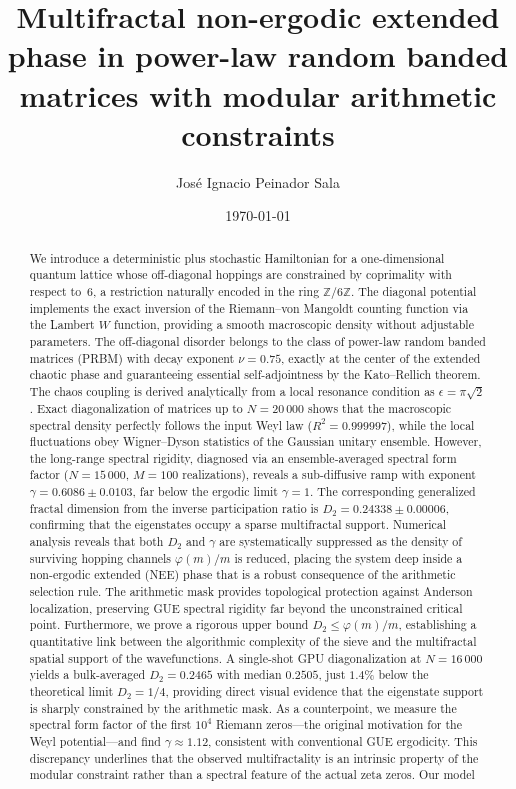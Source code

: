 \documentclass[aps,prl,preprint,superscriptaddress,floatfix]{revtex4-2}
\begin{document}
\title{Multifractal non-ergodic extended phase in power-law random banded matrices with modular arithmetic constraints}

\author{José Ignacio Peinador Sala }

\date{\today}

\begin{abstract}
We introduce a deterministic plus stochastic Hamiltonian for a one-dimensional quantum lattice whose off-diagonal hoppings are constrained by coprimality with respect to~6, a restriction naturally encoded in the ring $\mathbb{Z}/6\mathbb{Z}$. The diagonal potential implements the exact inversion of the Riemann--von Mangoldt counting function via the Lambert $W$ function, providing a smooth macroscopic density without adjustable parameters. The off-diagonal disorder belongs to the class of power-law random banded matrices (PRBM) with decay exponent $\nu=0.75$, exactly at the center of the extended chaotic phase and guaranteeing essential self-adjointness by the Kato--Rellich theorem. The chaos coupling is derived analytically from a local resonance condition as $\epsilon = \pi\sqrt{2}$. Exact diagonalization of matrices up to $N=20\,000$ shows that the macroscopic spectral density perfectly follows the input Weyl law ($R^2=0.999997$), while the local fluctuations obey Wigner--Dyson statistics of the Gaussian unitary ensemble. However, the long-range spectral rigidity, diagnosed via an ensemble-averaged spectral form factor ($N=15\,000$, $M=100$ realizations), reveals a sub-diffusive ramp with exponent $\gamma = 0.6086 \pm 0.0103$, far below the ergodic limit $\gamma=1$. The corresponding generalized fractal dimension from the inverse participation ratio is $D_2 = 0.24338 \pm 0.00006$, confirming that the eigenstates occupy a sparse multifractal support. Numerical analysis reveals that both $D_2$ and $\gamma$ are systematically suppressed as the density of surviving hopping channels $\varphi(m)/m$ is reduced, placing the system deep inside a non-ergodic extended (NEE) phase that is a robust consequence of the arithmetic selection rule. The arithmetic mask provides topological protection against Anderson localization, preserving GUE spectral rigidity far beyond the unconstrained critical point. Furthermore, we prove a rigorous upper bound $D_2 \le \varphi(m)/m$, establishing a quantitative link between the algorithmic complexity of the sieve and the multifractal spatial support of the wavefunctions. A single-shot GPU diagonalization at $N=16\,000$ yields a bulk-averaged $D_2 = 0.2465$ with median $0.2505$, just $1.4\%$ below the theoretical limit $D_2 = 1/4$, providing direct visual evidence that the eigenstate support is sharply constrained by the arithmetic mask. As a counterpoint, we measure the spectral form factor of the first $10^4$ Riemann zeros---the original motivation for the Weyl potential---and find $\gamma \approx 1.12$, consistent with conventional GUE ergodicity. This discrepancy underlines that the observed multifractality is an intrinsic property of the modular constraint rather than a spectral feature of the actual zeta zeros. Our model 
\end{abstract}
\end{document}
